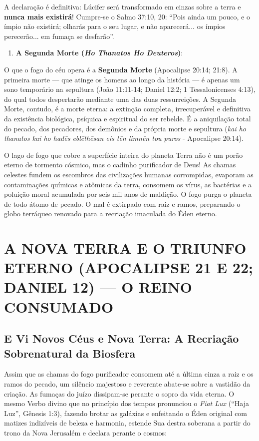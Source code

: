 A declaração é definitiva: Lúcifer será transformado em cinzas sobre a terra e \textbf{nunca mais existirá}! Cumpre-se o Salmo 37:10, 20: ``Pois ainda um pouco, e o ímpio não existirá; olharás para o seu lugar, e não aparecerá... os ímpios perecerão... em fumaça se desfarão''.

\begin{enumerate}
  \item \textbf{A Segunda Morte (\textit{Ho Thanatos Ho Deuteros})}:
\end{enumerate}

O que o fogo do céu opera é a \textbf{Segunda Morte} (Apocalipse 20:14; 21:8).
A primeira morte — que atinge os homens ao longo da história — é apenas um sono temporário na sepultura (João 11:11-14; Daniel 12:2; 1 Tessalonicenses 4:13), do qual todos despertarão mediante uma das duas ressurreições.
A Segunda Morte, contudo, é a morte eterna: a extinção completa, irrecuperável e definitiva da existência biológica, psíquica e espiritual do ser rebelde. É a aniquilação total do pecado, dos pecadores, dos demônios e da própria morte e sepultura (\textit{kai ho thanatos kai ho hadēs eblēthēsan eis tēn limnēn tou puros} - Apocalipse 20:14).

O lago de fogo que cobre a superfície inteira do planeta Terra não é um porão eterno de tormento cósmico, mas o cadinho purificador de Deus! As chamas celestes fundem os escombros das civilizações humanas corrompidas, evaporam as contaminações químicas e atômicas da terra, consomem os vírus, as bactérias e a poluição moral acumulada por seis mil anos de maldição.
O fogo purga o planeta de todo átomo de pecado. O mal é extirpado com raiz e ramos, preparando o globo terráqueo renovado para a recriação imaculada do Éden eterno.



\section{A NOVA TERRA E O TRIUNFO ETERNO (APOCALIPSE 21 E 22; DANIEL 12) — O REINO CONSUMADO}



\subsection{E Vi Novos Céus e Nova Terra: A Recriação Sobrenatural da Biosfera}


Assim que as chamas do fogo purificador consomem até a última cinza a raiz e os ramos do pecado, um silêncio majestoso e reverente abate-se sobre a vastidão da criação. As fumaças do juízo dissipam-se perante o sopro da vida eterna. O mesmo Verbo divino que no princípio dos tempos pronunciou o \textit{Fiat Lux} (``Haja Luz'', Gênesis 1:3), fazendo brotar as galáxias e enfeitando o Éden original com matizes indizíveis de beleza e harmonia, estende Sua destra soberana a partir do trono da Nova Jerusalém e declara perante o cosmos:


